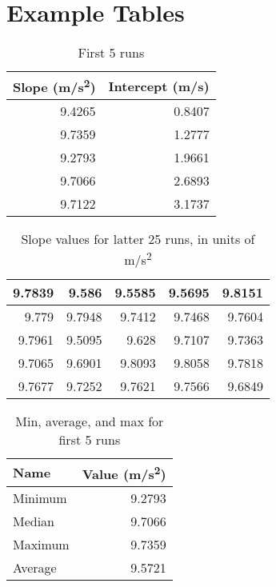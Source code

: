 \section{Example Tables}
%
\begin{table}[ht]
    \centering
    \begin{tabular}{r|r}
        \textbf{Slope} (m/s\textsuperscript{2}) & \textbf{Intercept} (m/s) \\
        \hline
        9.4265 & 0.8407 \\
        9.7359 & 1.2777 \\
        9.2793 & 1.9661 \\
        9.7066 & 2.6893 \\
        9.7122 & 3.1737 \\
        \hline
    \end{tabular}
    \caption{First 5 runs}
    \label{table:01.first.5}
\end{table}
%
\begin{table}[ht]
    \centering
    \begin{tabular}{r|r|r|r|r}
        \hline
        9.7839 & 9.586 & 9.5585 & 9.5695 & 9.8151 \\
        \hline
        9.779 & 9.7948 & 9.7412 & 9.7468 & 9.7604 \\
        \hline
        9.7961 & 9.5095 & 9.628 & 9.7107 & 9.7363 \\
        \hline
        9.7065 & 9.6901 & 9.8093 & 9.8058 & 9.7818 \\
        \hline
        9.7677 & 9.7252 & 9.7621 & 9.7566 & 9.6849 \\
        \hline
    \end{tabular}
    \caption{Slope values for latter 25 runs, in units of m/s\textsuperscript{2}}
    \label{table:01.latter.25}
\end{table}
%
\begin{table}[ht]
    \centering
    \begin{tabular}{l|r}
        \textbf{Name} & \textbf{Value} (m/s\textsuperscript{2}) \\
        \hline
        Minimum & 9.2793 \\
        Median & 9.7066 \\
        Maximum & 9.7359 \\
        Average & 9.5721 \\
        \hline
    \end{tabular}
    \caption{Min, average, and max for first 5 runs}
    \label{table:01.describe.5}
\end{table}
